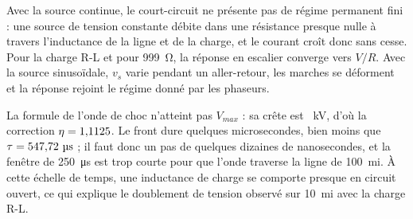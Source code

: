 Avec la source continue, le court-circuit ne présente pas de régime permanent fini : une source
de tension constante débite dans une résistance presque nulle à travers l'inductance de la ligne
et de la charge, et le courant croît donc sans cesse. Pour la charge R-L et pour 999~\unit{\ohm},
la réponse en escalier converge vers $V/R$. Avec la source sinusoïdale, $v_s$ varie pendant un
aller-retour, les marches se déforment et la réponse rejoint le régime donné par les phaseurs.

La formule de l'onde de choc n'atteint pas $V_{max}$ : sa crête est \chocCrete~kV, d'où la
correction $\eta = 1{,}1125$. Le front dure quelques microsecondes, bien moins que
$\tau = \tauL~\unit{\micro s}$ ; il faut donc un pas de quelques dizaines de nanosecondes, et la
fenêtre de \SI{250}{\micro s} est trop courte pour que l'onde traverse la ligne de 100~mi.
À cette échelle de temps, une inductance de charge se comporte presque en circuit ouvert, ce qui
explique le doublement de tension observé sur 10~mi avec la charge R-L.
